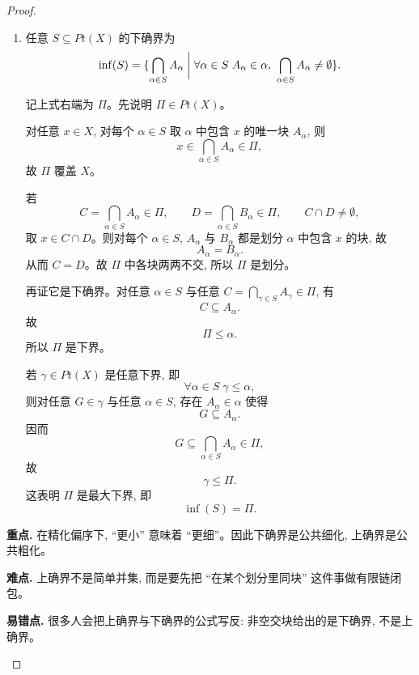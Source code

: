 \documentclass[a4paper, justified]{tufte-handout}
\begin{document}
\begin{proof}
\begin{enumerate}[(1)]
      因而任意 $S \subseteq Pt(X)$ 都有上确界, 且
      \[
        \sup(S) = X/\approx,
      \]
      其中 $\approx$ 是由所有 $\alpha \in S$ 的同块关系生成的最小等价关系。

    \item 任意 $S \subseteq Pt(X)$ 的下确界为
      \[
        \inf(S)
        = \{
            \bigcap_{\alpha \in S} A_{\alpha}
            \;\bigg|\;
            \forall \alpha \in S\; A_{\alpha} \in \alpha,
            \ \bigcap_{\alpha \in S} A_{\alpha} \neq \emptyset
          \}.
      \]

      记上式右端为 $\Pi$。先说明 $\Pi \in Pt(X)$。

      对任意 $x \in X$, 对每个 $\alpha \in S$ 取 $\alpha$ 中包含 $x$ 的唯一块 $A_{\alpha}$, 则
      \[
        x \in \bigcap_{\alpha \in S} A_{\alpha} \in \Pi,
      \]
      故 $\Pi$ 覆盖 $X$。

      若
      \[
        C = \bigcap_{\alpha \in S} A_{\alpha} \in \Pi,
        \qquad
        D = \bigcap_{\alpha \in S} B_{\alpha} \in \Pi,
        \qquad
        C \cap D \neq \emptyset,
      \]
      取 $x \in C \cap D$。则对每个 $\alpha \in S$, $A_{\alpha}$ 与 $B_{\alpha}$ 都是划分 $\alpha$ 中包含 $x$ 的块, 故
      \[
        A_{\alpha} = B_{\alpha}.
      \]
      从而 $C = D$。故 $\Pi$ 中各块两两不交, 所以 $\Pi$ 是划分。

      再证它是下确界。对任意 $\alpha \in S$ 与任意 $C = \bigcap_{\gamma \in S} A_{\gamma} \in \Pi$, 有
      \[
        C \subseteq A_{\alpha}.
      \]
      故
      \[
        \Pi \le \alpha.
      \]
      所以 $\Pi$ 是下界。

      若 $\gamma \in Pt(X)$ 是任意下界, 即
      \[
        \forall \alpha \in S\; \gamma \le \alpha,
      \]
      则对任意 $G \in \gamma$ 与任意 $\alpha \in S$, 存在 $A_{\alpha} \in \alpha$ 使得
      \[
        G \subseteq A_{\alpha}.
      \]
      因而
      \[
        G \subseteq \bigcap_{\alpha \in S} A_{\alpha} \in \Pi,
      \]
      故
      \[
        \gamma \le \Pi.
      \]
      这表明 $\Pi$ 是最大下界, 即
      \[
        \inf(S) = \Pi.
      \]
  \end{enumerate}

  \begin{remark}
    \textbf{重点.} 在精化偏序下, ``更小'' 意味着 ``更细''。因此下确界是公共细化, 上确界是公共粗化。\par
    \textbf{难点.} 上确界不是简单并集, 而是要先把 ``在某个划分里同块'' 这件事做有限链闭包。\par
    \textbf{易错点.} 很多人会把上确界与下确界的公式写反: 非空交块给出的是下确界, 不是上确界。
  \end{remark}


\end{proof}
\end{document}
